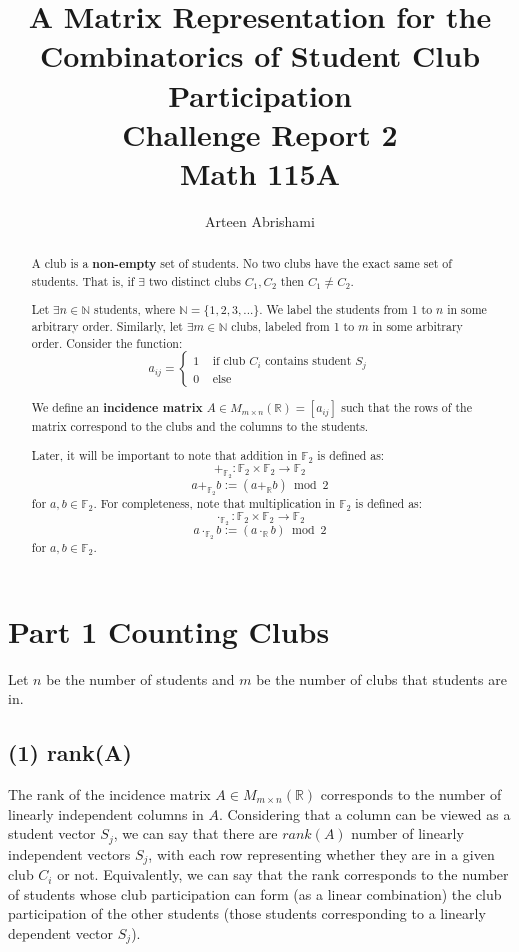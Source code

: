 \documentclass[12pt, letterpaper]{article}
\title{
A Matrix Representation for the Combinatorics of Student Club Participation \\
\large Challenge Report 2 \\
Math 115A}
\author{Arteen Abrishami}
\date{}
\newcommand{\F}{\mathbb{F}}
\newcommand{\R}{\mathbb{R}}
\newcommand{\N}{\mathbb{N}}
\newcommand{\0}{\textbf{0}}
\newcommand{\1}{\textbf{1}}
\begin{document}
\maketitle
\begin{abstract}
A club is a \textbf{non-empty} set of students. No two clubs have the exact same set of students. That is, if $\exists$ two distinct clubs $C_{1}, C_{2} $ then $ C_{1} \ne C_{2} $. 

Let $ \exists n \in \N $ students, where $ \N = \{ 1, 2, 3, ... \} $. We label the students from 1 to $n$ in some arbitrary order. Similarly, let $\exists m \in \N $ clubs, labeled from 1 to $m$ in some arbitrary order. Consider the function:
$$ a_{ij} = \left\{
		\begin{array}{ll}
			1 & \text{ if club } C_i \text{ contains student } S_j \\
			0 & \text{ else} 
		\end{array}
		\right.$$

We define an \textbf{incidence matrix} $A \in M_{m \times n}(\R) = [a_{ij}] $ such that the rows of the matrix correspond to the clubs and the columns to the students.

Later, it will be important to note that addition in $\F_2$ is defined as: 
$$+_{\F_2}: \F_2 \times \F_2 \rightarrow \F_2$$ $$ a +_{\F_2} b := (a +_{\R} b)\bmod{2} $$
 for $a, b \in \F_2$. For completeness, note that multiplication in $\F_2$ is defined as: 
 $$\cdot_{\F_2}: \F_2 \times \F_2 \rightarrow \F_2$$ $$ a \cdot_{\F_2} b := (a \cdot_{\R} b)\bmod{2} $$
 for $a, b \in \F_2$. \\
 \end{abstract}

\section*{Part 1 \textmd{Counting Clubs}}

Let $n$ be the number of students and $m$ be the number of clubs that students are in.

\subsection*{(1) \textmd{rank(A)}}

The rank of the incidence matrix $A \in M_{m \times n}(\R)$ corresponds to the number of linearly independent columns in $A$. Considering that a column can be viewed as a student vector $S_{j}$, we can say that there are $rank(A)$ number of linearly independent vectors $S_{j}$, with each row representing whether they are in a given club $C_i$ or not. Equivalently, we can say that the rank corresponds to the number of students whose club participation can form (as a linear combination) the club participation of the other students (those students corresponding to a linearly dependent vector $S_{j}$).
\end{document}
